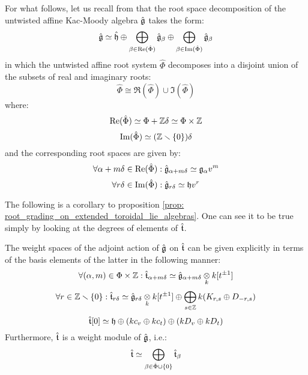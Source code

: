         \begin{remark}
            For what follows, let us recall from \cite[Chapter 7]{kac_infinite_dimensional_lie_algebras} that the root space decomposition of the untwisted affine Kac-Moody algebra $\hat{\mathfrak{g}}$ takes the form:
                $$\hat{\mathfrak{g}} \simeq \hat{\mathfrak{h}} \oplus \bigoplus_{\beta \in \operatorname{Re}(\hat{\Phi})} \hat{\mathfrak{g}}_{\beta} \oplus \bigoplus_{\beta \in \operatorname{Im}(\hat{\Phi})} \hat{\mathfrak{g}}_{\beta}$$
            in which the untwisted affine root system $\hat{\Phi}$ decomposes into a disjoint union of the subsets of real and imaginary roots:
                $$\hat{\Phi} \cong \Re(\hat{\Phi}) \cup \Im(\hat{\Phi})$$
            where:
                $$\Re(\hat{\Phi}) \cong \Phi + \Z\delta \cong \Phi \x \Z$$
                $$\operatorname{Im}(\hat{\Phi}) \simeq (\mathbb{Z} \smallsetminus \{0\})\delta$$
            and the corresponding root spaces are given by:
                $$\forall \alpha + m\delta \in \operatorname{Re}(\hat{\Phi}): \hat{\mathfrak{g}}_{\alpha + m\delta} \simeq \mathfrak{g}_{\alpha} v^m$$
                $$\forall r\delta \in \operatorname{Im}(\hat{\Phi}): \hat{\mathfrak{g}}_{r\delta} \simeq \mathfrak{h} v^r$$
        \end{remark}    
        The following is a corollary to proposition \ref{prop: root_grading_on_extended_toroidal_lie_algebras}. One can see it to be true simply by looking at the degrees of elements of $\hat{\mathfrak{t}}$. 
        \begin{theorem} \label{theorem: root_space_decomposition_for_extended_toroidal_lie_algebras}
            The weight spaces of the adjoint action of $\hat{\mathfrak{g}}$ on $\hat{\mathfrak{t}}$ can be given explicitly in terms of the basis elements of the latter in the following manner:
                $$\forall (\alpha, m) \in \Phi \x \Z: \extendedtoroidal_{\alpha + m\delta} \cong \hat{\g}_{\alpha + m\delta} \tensor_{k} k[t^{\pm 1}]$$
                $$
                    \forall r \in \Z \setminus \{0\}: \extendedtoroidal_{r\delta} \cong \hat{\g}_{r\delta} \tensor_{k} k[t^{\pm 1}] \oplus \bigoplus_{s \in \Z} k (K_{r, s} \oplus D_{-r, s})
                $$
                $$\hat{\mathfrak{t}}[0] \simeq \mathfrak{h} \oplus (k c_v \oplus k c_t) \oplus (k D_v \oplus k D_t)$$
            Furthermore, $\hat{\mathfrak{t}}$ is a weight module of $\hat{\mathfrak{g}}$, i.e.:
                $$\hat{\mathfrak{t}} \simeq \bigoplus_{\beta \in \hat{\Phi} \cup \{0\}} \hat{\mathfrak{t}}_{\beta}$$
        \end{theorem}

